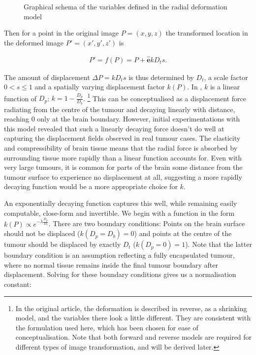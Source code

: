 \begin{figure}[htp]
  \centering
  
  \caption{Graphical schema of the variables defined in the radial deformation model}
  \label{fig:virtue}
\end{figure}

Then for a point in the original image $P = (x,y,z)$ the transformed location in the deformed image $P' = (x',y',z')$ is

\begin{align}\label{eq:forwardP}
  P' = f(P) = P + \mathbf{\hat{e}}kD_ts.
\end{align}

The amount of displacement $\Delta P = kD_ts$ is thus determined by $D_t$, a scale factor $0<s \leq 1$ and a spatially varying displacement factor $k(P)$.
In \textcite{Nowinski2005}, $k$ is a linear function of $D_p$: $k = 1-\frac{D_p}{D_b}$. \footnote[2]{In the original \textcite{Nowinski2005} article, the deformation is described in reverse, as a shrinking model, and the variables there look a little different. They are consistent with the formulation used here, which has been chosen for ease of conceptualisation. Note that both forward and reverse models are required for different types of image transformation, and will be derived later.}
This can be conceptualised as a displacement force radiating from the centre of the tumour and decaying linearly with distance, reaching 0 only at the brain boundary.
However, initial experimentations with this model revealed that such a linearly decaying force doesn't do well at capturing the displacement fields observed in real tumour cases.
The elasticity and compressibility of brain tissue means that the radial force is absorbed by surrounding tissue more rapidly than a linear function accounts for.
Even with very large tumours, it is common for parts of the brain some distance from the tumour surface to experience no displacement at all, suggesting a  more rapidly decaying function would be a more appropriate choice for $k$.

An exponentially decaying function captures this well, while remaining easily computable, close-form and invertible.
We begin with a function in the form $k(P) \propto e^{-\lambda \frac{D_p}{D_t}}$.
There are two boundary conditions:
Points on the brain surface should not be displaced ($k(D_p = D_b) = 0$) and points at the centre of the tumour should be displaced by exactly $D_t$ ($k(D_p = 0) = 1$).
Note that the latter boundary condition is an assumption reflecting a fully encapsulated tumour, where no normal tissue remains inside the final tumour boundary after displacement.
Solving for these boundary conditions gives us a normalisation constant:

